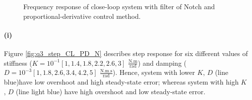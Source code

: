 \begin{figure}[h!]
	\centering
	\hfill
	\caption{Frequency response of close-loop system with filter of Notch and proportional-derivative control method.}
	\label{fig:q3_CL_N_PD_bode}
\end{figure}

\newpage
\paragraph{(i)} Figure \ref{fig:q3_step_CL_PD_N} describes step response for six different values of stiffness  ($K=10^{-1}[1, 1.4, 1.8, 2.2, 2.6, 3]$ $\mathrm{\frac{N.m}{rad}}$) and damping ($D=10^{-3}[1, 1.8, 2.6, 3.4, 4.2, 5]$ $\mathrm{\frac{N.m.s}{rad}}$).  Hence, system with lower $K$, $D$ (line blue)have low overshoot and high steady-state error; whereas system with high $K$, $D$ (line light blue) have high overshoot and low steady-state error.



